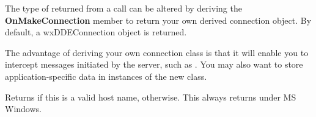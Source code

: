 \label{wxddeclientonmakeconnection}


The type of  returned from a  call can
be altered by deriving the {\bf OnMakeConnection} member to return your
own derived connection object. By default, a wxDDEConnection
object is returned.

The advantage of deriving your own connection class is that it will
enable you to intercept messages initiated by the server, such
as . You may also want to
store application-specific data in instances of the new class.

\label{wxddeclientvalidhost}


Returns \true if this is a valid host name, \false otherwise. This always
returns \true under MS Windows.

